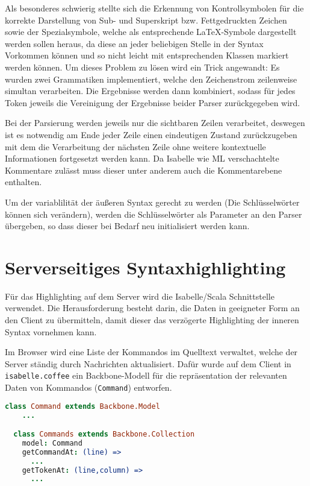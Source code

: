 Als besonderes schwierig stellte sich die Erkennung von Kontrollsymbolen für die korrekte
Darstellung von Sub- und Superskript bzw. Fettgedruckten Zeichen sowie der Spezialsymbole, welche
als entsprechende LaTeX-Symbole dargestellt werden sollen heraus, da diese an jeder beliebigen
Stelle in der Syntax Vorkommen können und so nicht leicht mit entsprechenden Klassen markiert werden
können. Um dieses Problem zu lösen wird ein Trick angewandt: Es wurden zwei Grammatiken
implementiert, welche den Zeichenstrom zeilenweise simultan verarbeiten. Die Ergebnisse werden dann
kombiniert, sodass für jedes Token jeweils die Vereinigung der Ergebnisse beider Parser
zurückgegeben wird.

Bei der Parsierung werden jeweils nur die sichtbaren Zeilen verarbeitet, deswegen ist es notwendig
am Ende jeder Zeile einen eindeutigen Zustand zurückzugeben mit dem die Verarbeitung der nächsten
Zeile ohne weitere kontextuelle Informationen fortgesetzt werden kann. Da Isabelle wie ML
verschachtelte Kommentare zulässt muss dieser unter anderem auch die Kommentarebene enthalten.

Um der variablilität der äußeren Syntax gerecht zu werden (Die Schlüsselwörter können sich
verändern), werden die Schlüsselwörter als Parameter an den Parser übergeben, so dass dieser bei
Bedarf neu initialisiert werden kann.

\section{Serverseitiges Syntaxhighlighting}

Für das Highlighting auf dem Server wird die Isabelle/Scala Schnittstelle verwendet. Die
Herausforderung besteht darin, die Daten in geeigneter Form an den Client zu übermitteln, damit
dieser das verzögerte Highlighting der inneren Syntax vornehmen kann.

Im Browser wird eine Liste der Kommandos im Quelltext verwaltet, welche der Server ständig durch
Nachrichten aktualisiert. Dafür wurde auf dem Client in \texttt{isabelle.coffee} ein Backbone-Modell
für die repräsentation der relevanten Daten von Kommandos (\texttt{Command}) entworfen.

\begin{lstlisting}[language=coffee]
  class Command extends Backbone.Model
    ...

  class Commands extends Backbone.Collection
    model: Command    
    getCommandAt: (line) => 
      ...
    getTokenAt: (line,column) =>
      ...
\end{lstlisting}

